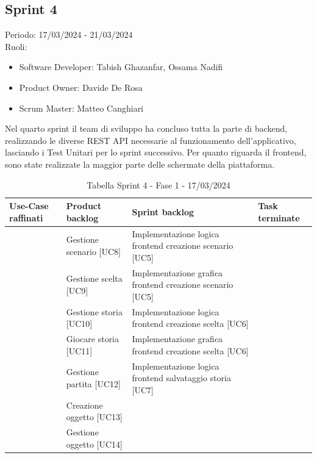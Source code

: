 \documentclass{article}
\begin{document}
\clearpage
\subsection*{Sprint 4}
Periodo: 17/03/2024 - 21/03/2024\vspace*{7pt}\\
Ruoli:
\begin{itemize}[label = { }]
    \itemsep0em
    \item Software Developer: Tabish Ghazanfar, Ossama Nadifi 
    \item Product Owner: Davide De Rosa
    \item Scrum Master: Matteo Canghiari
\end{itemize}
Nel quarto sprint il team di sviluppo ha concluso tutta la parte di backend, realizzando le diverse REST API necessarie al funzionamento dell’applicativo, lasciando i Test Unitari per lo sprint successivo. Per quanto riguarda il frontend, sono state realizzate la maggior parte delle schermate della piattaforma.

\begin{table}[h]
    \centering
    \begin{tabularx}{\textwidth}{|X|X|X|X|}
        \hline
        \bf Use-Case raffinati & \bf Product backlog & \bf Sprint backlog & \bf Task terminate \\
        \hline
        & Gestione scenario [UC8] & Implementazione logica frontend creazione scenario [UC5] & \\
        \hline
        & Gestione scelta [UC9] & Implementazione grafica frontend creazione scenario [UC5] & \\
        \hline
        & Gestione storia [UC10] & Implementazione logica frontend creazione scelta [UC6] & \\
        \hline
        & Giocare storia [UC11] & Implementazione grafica frontend creazione scelta [UC6] & \\
        \hline
        & Gestione partita [UC12] & Implementazione logica frontend salvataggio storia [UC7] & \\
        \hline
        & Creazione oggetto [UC13] &  & \\
        \hline
        & Gestione oggetto [UC14] &  & \\
        \hline
    \end{tabularx}
    \caption*{Tabella Sprint 4 - Fase 1 - 17/03/2024}
\end{table}
\end{document}

